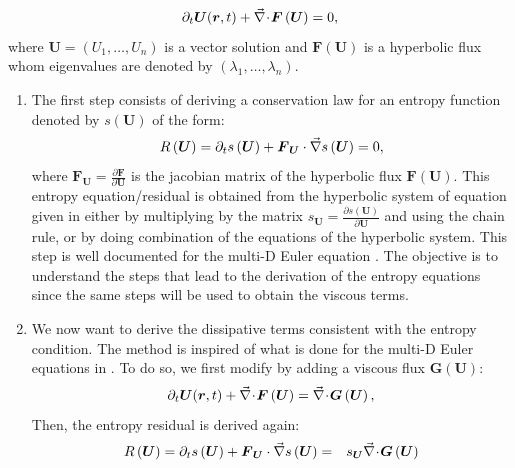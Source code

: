 %
\begin{equation}\label{eq:hyp_syst_sct1b}
\partial_t \boldsymbol{U}(\boldsymbol r,t) + \vec{\nabla}\! \cdot \! \boldsymbol{F} \left( \boldsymbol{U} \right) = 0,
\end{equation}
%
where $\boldsymbol{U} = \left( U_1, \dots, U_n \right)$ is a vector solution and $\boldsymbol{F} \left( \boldsymbol{U} \right)$ is a hyperbolic flux whom eigenvalues are denoted by $\left( \lambda_1, \dots, \lambda_n \right)$.
\begin{enumerate}
\item The first step consists of deriving a conservation law for an entropy function denoted by $s\left(\boldsymbol{U}\right)$ of the form: 
%
\begin{equation}
R\left(\boldsymbol{U}\right) = \partial_t s\left(\boldsymbol{U}\right) + \boldsymbol{F}_{\boldsymbol{U}} \cdot \vec{\nabla} s \left(\boldsymbol{U}\right) = 0,
\end{equation}
%
where $\boldsymbol{F}_{\boldsymbol{U}} = \frac{\partial \boldsymbol{F}}{\partial \boldsymbol{U}}$ is the jacobian matrix of the hyperbolic flux $\boldsymbol{F} \left( \boldsymbol{U} \right)$.
This entropy equation/residual is obtained from the hyperbolic system of equation given in  either by multiplying by the matrix $s_{\boldsymbol{U}} = \frac{\partial s (\boldsymbol{U})}{\partial \boldsymbol{U}}$ and using the chain rule, or by doing combination of the equations of the hyperbolic system. This step is well documented for the multi-D Euler equation \cite{Toro}. The objective is to understand the steps that lead to the derivation of the entropy equations since the same steps will be used to obtain the viscous terms.
\item We now want to derive the dissipative terms consistent with the entropy condition. The method is inspired of what is done for the multi-D Euler equations in \cite{jlg}. To do so, we first modify  by adding a viscous flux $\boldsymbol{G} \left( \boldsymbol{U} \right)$:
%
\begin{equation}\label{eq:hyp_syst2_sct1b}
\partial_t \boldsymbol{U}(\boldsymbol r,t) + \vec{\nabla}\! \cdot \! \boldsymbol{F} \left( \boldsymbol{U} \right) = \vec{\nabla}\! \cdot \! \boldsymbol{G} \left( \boldsymbol{U} \right),
\end{equation}
%
Then, the entropy residual is derived again:
%
\begin{eqnarray}\label{eq:hyp_syst3_sct1b}
R\left(\boldsymbol{U}\right) = \partial_t s\left(\boldsymbol{U}\right) + \boldsymbol{F}_{\boldsymbol{U}} \cdot \grad s \left(\boldsymbol{U}\right) &=& s_{\boldsymbol{U}} \div \boldsymbol{G} \left( \boldsymbol{U} \right) \nonumber \\

\end{eqnarray}
\end{enumerate}
